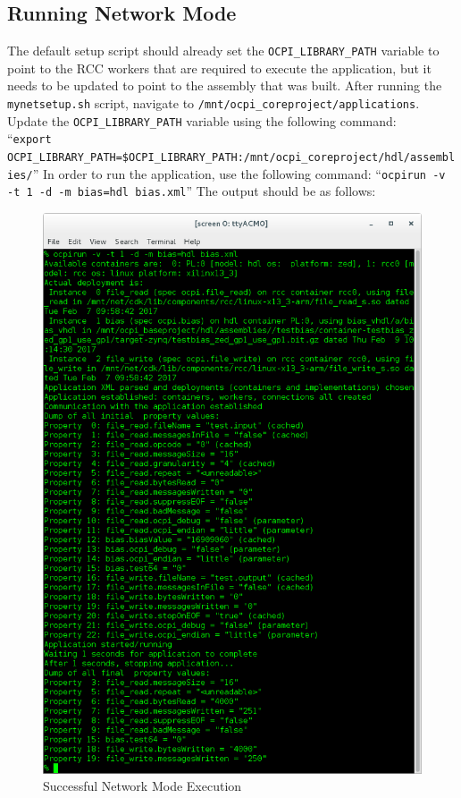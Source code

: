 \subsection{Running Network Mode}
The default setup script should already set the \texttt{OCPI\_LIBRARY\_PATH} variable to point to the RCC workers that are required to execute the application, but it needs to be updated to point to the assembly that was built.  After running the \texttt{mynetsetup.sh} script, navigate to  \texttt{/mnt/ocpi\_coreproject/applications}. Update the \texttt{OCPI\_LIBRARY\_PATH} variable using the following command: \\ ``\texttt{export OCPI\_LIBRARY\_PATH=\$OCPI\_LIBRARY\_PATH:/mnt/ocpi\_coreproject/hdl/assemblies/}''
In order to run the application, use the following command: ``\texttt{ocpirun -v -t 1 -d -m bias=hdl bias.xml}'' The output should be as follows:
\begin{figure}[H]
	\centerline{\includegraphics[scale=0.5]{zed_net_bias}}
	\caption{Successful Network Mode Execution}
	\label{fig:netBias}
\end{figure}

